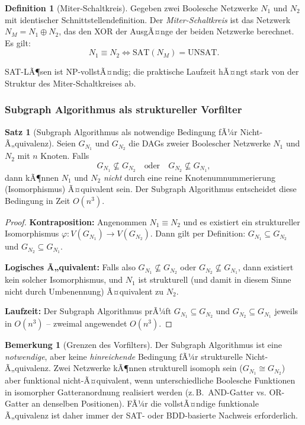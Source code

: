 ﻿\documentclass[a4paper,12pt]{article}
\theoremstyle{definition}
\newtheorem{definition}{Definition}
\newtheorem{satz}{Satz}
\newtheorem{bemerkung}{Bemerkung}
\begin{document}
\begin{definition}[Miter-Schaltkreis]\label{def:miter}
  Gegeben zwei Boolesche Netzwerke $N_1$ und $N_2$ mit identischer Schnittstellendefinition.
  Der \emph{Miter-Schaltkreis} ist das Netzwerk $N_M = N_1 \oplus N_2$, das den
  XOR der AusgÃ¤nge der beiden Netzwerke berechnet. Es gilt:
  \[
    N_1 \equiv N_2 \iff \text{SAT}(N_M) = \text{UNSAT}.
  \]
\end{definition}

SAT-LÃ¶sen ist NP-vollstÃ¤ndig; die praktische Laufzeit hÃ¤ngt stark von der Struktur
des Miter-Schaltkreises ab.

\subsubsection{Subgraph Algorithmus als struktureller Vorfilter}

\begin{satz}[Subgraph Algorithmus als notwendige Bedingung fÃ¼r Nicht-Ã„quivalenz]
  \label{satz:vorfilter}
  Seien $G_{N_1}$ und $G_{N_2}$ die DAGs zweier Boolescher Netzwerke $N_1$ und $N_2$ mit
  $n$ Knoten. Falls
  \[
    G_{N_1} \not\subseteq G_{N_2} \quad \text{oder} \quad G_{N_2} \not\subseteq G_{N_1},
  \]
  dann kÃ¶nnen $N_1$ und $N_2$ \emph{nicht} durch eine reine Knotenumnummerierung
  (Isomorphismus) Ã¤quivalent sein. Der Subgraph Algorithmus entscheidet diese
  Bedingung in Zeit $O(n^3)$.
\end{satz}

\begin{proof}
  \textbf{Kontraposition:} Angenommen $N_1 \equiv N_2$ und es existiert ein struktureller
  Isomorphismus $\varphi: V(G_{N_1}) \to V(G_{N_2})$. Dann gilt per Definition:
  $G_{N_1} \subseteq G_{N_2}$ und $G_{N_2} \subseteq G_{N_1}$.

  \textbf{Logisches Ã„quivalent:} Falls also $G_{N_1} \not\subseteq G_{N_2}$ oder
  $G_{N_2} \not\subseteq G_{N_1}$, dann existiert kein solcher Isomorphismus, und $N_1$
  ist strukturell (und damit in diesem Sinne nicht durch Umbenennung) Ã¤quivalent zu $N_2$.

  \textbf{Laufzeit:} Der Subgraph Algorithmus prÃ¼ft $G_{N_1} \subseteq G_{N_2}$ und
  $G_{N_2} \subseteq G_{N_1}$ jeweils in $O(n^3)$ -- zweimal angewendet $O(n^3)$.
\end{proof}

\begin{bemerkung}[Grenzen des Vorfilters]\label{bem:vorfiltergrenze}
  Der Subgraph Algorithmus ist eine \emph{notwendige}, aber keine \emph{hinreichende}
  Bedingung fÃ¼r strukturelle Nicht-Ã„quivalenz. Zwei Netzwerke kÃ¶nnen strukturell
  isomoph sein ($G_{N_1} \cong G_{N_2}$) aber funktional nicht-Ã¤quivalent, wenn
  unterschiedliche Boolesche Funktionen in isomorpher Gatteranordnung realisiert werden
  (z.\,B.\ AND-Gatter vs. OR-Gatter an denselben Positionen). FÃ¼r die vollstÃ¤ndige
  funktionale Ã„quivalenz ist daher immer der SAT- oder BDD-basierte Nachweis erforderlich.
\end{bemerkung}
\end{document}
